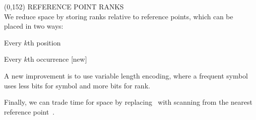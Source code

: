 \begin{textblock}{60}(0,152)
  {\sffamily\normalsize{\color{sciorange}
      REFERENCE POINT RANKS}}\vspace{1mm}\\
  \footnotesize 
  We reduce space by storing ranks relative to reference points,
  which can be placed in two ways:\\

  \begin{minipage}[t]{25mm}
    \scriptsize\sffamily
    \centering
    Every $k$th position~\cite{ll2005}
    \begin{center}
      
    \end{center}
  \end{minipage}
  \hfill
  \begin{minipage}[t]{30mm}
    \scriptsize\sffamily
    \centering
    Every $k$th occurrence [new]
    \begin{center}
      
    \end{center}
  \end{minipage}
  \vspace{3mm}

  \begin{minipage}{42mm}
    \raggedright
    A new improvement is to use variable length encoding, where
    a frequent symbol uses less bits for symbol and more bits for rank.
  \end{minipage}
  \hfill
  \begin{minipage}{17mm}
    \begin{center}
      
    \end{center}
  \end{minipage}
  \vspace{1mm}

  Finally, we can trade time for space by replacing \rank\ with
  scanning from the nearest reference point~\cite{ll2005}.
\end{textblock}

